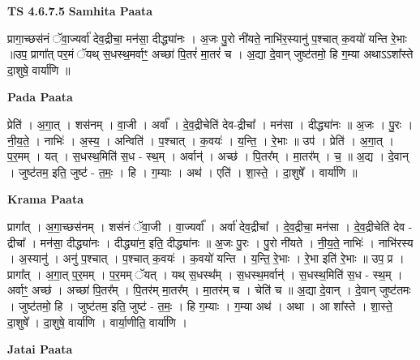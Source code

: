 \documentclass[17pt]{extarticle}
\begin{document}
\textbf{TS 4.6.7.5 } \newline
\textbf{Samhita Paata} \newline

प्रागा॒च्छस॑नं ॅवा॒ज्यर्वा॑ देव॒द्रीचा॒ मन॑सा॒ दीद्ध्या॑नः । अ॒जः पु॒रो नी॑यते॒ नाभि॑र॒स्यानु॑ प॒श्चात् क॒वयो॑ यन्ति रे॒भाः ॥उप॒ प्रागा᳚त् पर॒मं ॅयथ् स॒धस्थ॒मर्वाꣳ॒॒ अच्छा॑ पि॒तरं॑ मा॒तरं॑ च । अ॒द्या दे॒वान् जुष्ट॑तमो॒ हि ग॒म्या अथाऽऽशा᳚स्ते दा॒शुषे॒ वार्या॑णि ॥ \newline

\textbf{Pada Paata} \newline

प्रेति॑ । अ॒गा॒त् । शस॑नम् । वा॒जी । अर्वा᳚ । दे॒व॒द्रीचेति॑ देव-द्रीचा᳚ । मन॑सा । दीद्ध्या॑नः ॥ अ॒जः । पु॒रः । नी॒य॒ते॒ । नाभिः॑ । अ॒स्य॒ । अन्विति॑ । प॒श्चात् । क॒वयः॑ । य॒न्ति॒ । रे॒भाः ॥ उप॑ । प्रेति॑ । अ॒गा॒त् । प॒र॒मम् । यत् । स॒धस्थ॒मिति॑ स॒ध - स्थ॒म् । अर्वान्॑ । अच्छ॑ । पि॒तर᳚म् । मा॒तर᳚म् । च॒ ॥ अ॒द्य । दे॒वान् । जुष्ट॑तम॒ इति॒ जुष्ट॑ - त॒मः॒ । हि । ग॒म्याः । अथ॑ । एति॑ । शा॒स्ते॒ । दा॒शुषे᳚ । वार्या॑णि ॥  \newline


\textbf{Krama Paata} \newline

प्रागा᳚त् । अ॒गा॒च्छस॑नम् । शस॑नं ॅवा॒जी । वा॒ज्यर्वा᳚ । अर्वा॑ देव॒द्रीचा᳚ । दे॒व॒द्रीचा॒ मन॑सा । दे॒व॒द्रीचेति॑ देव - द्रीचा᳚ । मन॑सा॒ दीद्ध्या॑नः । दीद्ध्या॑न॒ इति॒ दीद्ध्या॑नः ॥ अ॒जः पु॒रः । पु॒रो नी॑यते । नी॒य॒ते॒ नाभिः॑ । नाभि॑रस्य । अ॒स्यानु॑ । अनु॑ प॒श्चात् । प॒श्चात् क॒वयः॑ । क॒वयो॑ यन्ति । य॒न्ति॒ रे॒भाः । रे॒भा इति॑ रे॒भाः ॥ उप॒ प्र । प्रागा᳚त् । अ॒गा॒त् प्॒र॒मम् । प॒र॒मम् ॅयत् । यथ् स॒धस्थ᳚म् । स॒धस्थ॒मर्वान्॑ । स॒धस्थ॒मिति॑ स॒ध - स्थ॒म् । अर्वाꣳ॒॒ अच्छ॑ । अच्छा॑ पि॒तर᳚म् । पि॒तर॑म् मा॒तर᳚म् । मा॒तर॑म् च । चेति॑ च ॥ अ॒द्या दे॒वान् । दे॒वान् जुष्ट॑तमः । जुष्ट॑तमो॒ हि । जुष्ट॑तम॒ इति॒ जुष्ट॑ - त॒मः॒ । हि ग॒म्याः । ग॒म्या अथ॑ । अथा । आ शा᳚स्ते । शा॒स्ते॒ दा॒शुषे᳚ । दा॒शुषे॒ वार्या॑णि । वार्या॒णीति॒ वार्या॑णि । \newline

\textbf{Jatai Paata} \newline
\end{document}
